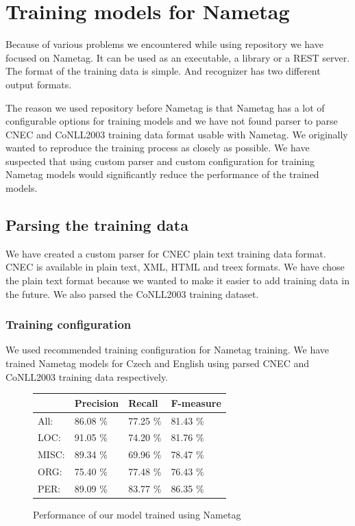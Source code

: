 \documentclass[thesis=B,english]{FITthesis}[2012/10/20]
\begin{document}
\section{Training models for Nametag}
Because of various problems we encountered while using \cite{repoStrakovaNER} repository we have focused on Nametag. It can be used as an executable, a library or a REST server. The format of the training data is simple. And recognizer has two different output formats. \cite{nametagWebsite}

\par The reason we used \cite{repoStrakovaNER} repository before Nametag is that Nametag has a lot of configurable options for training models and we have not found parser to parse CNEC and CoNLL2003 training data format usable with Nametag. We originally wanted to reproduce the training process as closely as possible. We have suspected that using custom parser and custom configuration for training Nametag models would significantly reduce the performance of the trained models.

\subsection{Parsing the training data}
\par We have created a custom parser for CNEC plain text training data format. CNEC is available in plain text, XML, HTML and treex formats. We have chose the plain text format because we wanted to make it easier to add training data in the future. We also parsed the CoNLL2003 training dataset.
\subsubsection{Training configuration}
We used recommended training configuration \cite{nametagWebsite} for Nametag training. We have trained Nametag models for Czech and English using parsed CNEC and CoNLL2003 training data respectively. 

\begin{figure}[h]
\centering
\caption[Performance of our model trained using Nametag]{Performance of our model trained using Nametag \protect\footnotemark }

\label{output_conlleval}
\begin{tabular}{|l|l|l|l|}
\hline
      & Precision & Recall & F-measure \\ \hline \hline
 All: & 86.08 \% & 77.25 \% & 81.43 \% \\ \hline
 LOC: & 91.05 \% & 74.20 \% & 81.76 \% \\ \hline
MISC: & 89.34 \% & 69.96 \% & 78.47 \% \\ \hline
 ORG: & 75.40 \% & 77.48 \% & 76.43 \% \\ \hline
 PER: & 89.09 \% & 83.77 \% & 86.35 \% \\ \hline
\end{tabular}
\end{figure}
\end{document}
